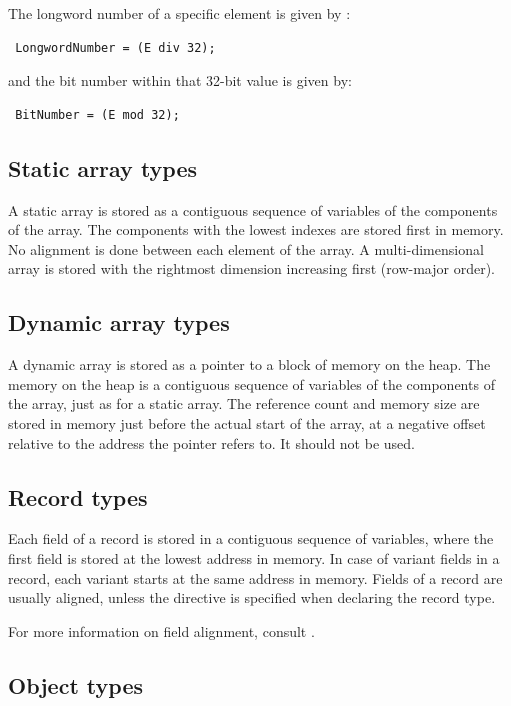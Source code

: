 The longword number of a specific element  is given by :
\begin{verbatim}
 LongwordNumber = (E div 32);
\end{verbatim}

and the bit number within that 32-bit value is given by:
\begin{verbatim}
 BitNumber = (E mod 32);
\end{verbatim}

\subsection{Static array types}

A static array is stored as a contiguous sequence of variables
of the components of the array. The components with the
lowest indexes are stored first in memory. No alignment
is done between each element of the array. A multi-dimensional
array is stored with the rightmost dimension increasing first
(row-major order).

\subsection{Dynamic array types}

A dynamic array is stored as a pointer to a block of memory on the heap.
The memory on the heap is a contiguous sequence of variables
of the components of the array, just as for a static array. The reference
count and memory size are stored in memory just before the actual start of
the array, at a negative offset relative to the address the pointer refers
to. It should not be used.

\subsection{Record types}

Each field of a record is stored in a contiguous sequence
of variables, where the first field is stored at the
lowest address in memory. In case of variant fields in
a record, each variant starts at the same address in
memory. Fields of a record are usually aligned, unless
the  directive is specified when declaring
the record type. 

For more information on field alignment, consult .

\subsection{Object types}
\label{subse:ObjMemory}

